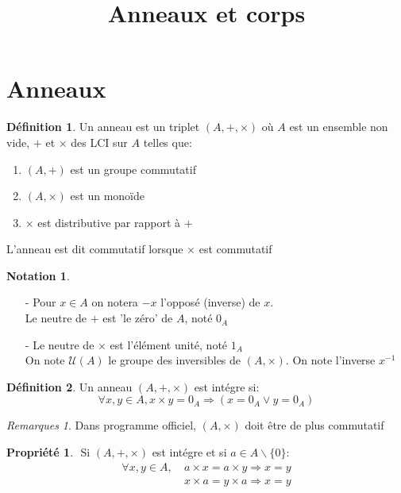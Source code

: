 \documentclass[fleqn]{article}
\title{Anneaux et corps}
\date{}
\theoremstyle{definition} \newtheorem*{defi}{D\'efinition}
\theoremstyle{definition} \newtheorem*{theo}{Th\'eor\`eme}
\theoremstyle{definition} \newtheorem*{coro}{Corollaire}
\theoremstyle{definition} \newtheorem*{nota}{Notation}
\theoremstyle{remark} \newtheorem*{rqs}{Remarques}
\theoremstyle{definition} \newtheorem*{prop}{Propri\'et\'e}
\begin{document}
\maketitle

\section{Anneaux}
\begin{defi}
	Un anneau est un triplet $(A, +, \times)$ o\`u $A$ est un ensemble non vide, $+$ et $\times$ des LCI sur $A$ telles que:
	\begin{enumerate}
		\item $(A, +)$ est un groupe commutatif
		\item $(A, \times)$ est un mono\"ide
		\item $\times$ est distributive par rapport \`a $+$
	\end{enumerate}
L'anneau est dit commutatif lorsque $\times$ est commutatif
\end{defi}

\begin{nota} $ $
	\begin{itemize}
		\item [-] Pour $x \in A$ on notera $-x$ l'oppos\'e (inverse) de $x$.\\
			Le neutre de $+$ est 'le z\'ero' de $A$, not\'e $0_A$
		\item [-] Le neutre de $\times$ est l'\'el\'ement unit\'e, not\'e $1_A$\\
			On note $\mathcal{U}(A)$ le groupe des inversibles de $(A, \times)$. On note l'inverse $x^{-1}$
	\end{itemize}
\end{nota}

\begin{defi}
	Un anneau $(A, + , \times)$ est int\'egre si:
	\[\forall x,y \in A, x\times y = 0_A \Rightarrow (x = 0_A \lor y = 0_A)\]
	\begin{rqs} Dans programme officiel, $(A, \times)$ doit \^etre de plus commutatif \end{rqs}
\end{defi}

\begin{prop} $ $
	Si $(A,+,\times)$ est int\'egre et si $a \in A\backslash \{0\}$:
		\begin{align*}
			\forall x,y \in A,\ & a \times x = a \times y \Rightarrow x = y \\
								& x \times a = y \times a \Rightarrow x = y
		\end{align*}
\end{prop}
\end{document}
